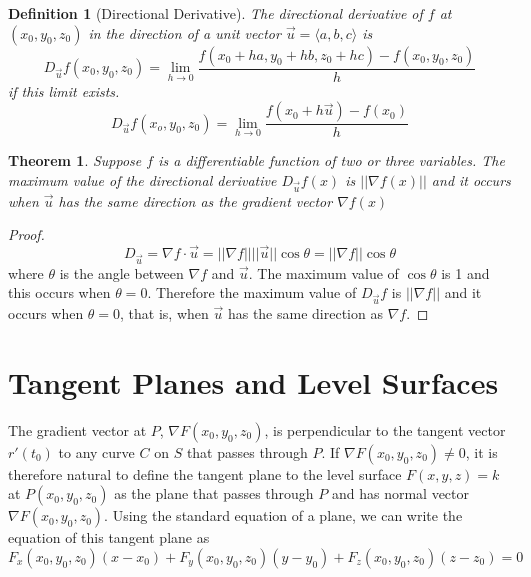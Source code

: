 \documentclass[10pt]{report}
\newtheorem{thm2}{Theorem}[section]
\newtheorem{def2}{Definition}[section]
\newcommand{\grad}{\nabla}
\begin{document}
\begin{def2}[Directional Derivative]
The directional derivative of $f$ at $(x_0, y_0, z_0)$ in the direction of a unit vector $\vec{u} = \langle a,b,c\rangle$ is
$$D_{\vec{u}} f(x_0, y_0,z_0) = \lim_{h\to 0}\frac{f(x_0 + ha, y_0+hb, z_0 +hc) - f(x_0,y_0,z_0)}{h}$$
if this limit exists.
$$D_{\vec{u}}f(x_o,y_0,z_0)=\lim_{h\to 0}\frac{f(x_0+h\vec{u})-f(x_0)}{h}$$
\end{def2}
\begin{thm2}
Suppose $f$ is a differentiable function of two or three variables. The maximum value of the directional derivative $D_{\vec{u}}f(x)$ is $||\grad f(x)||$ and it occurs when $\vec{u}$ has the same direction as the gradient vector $\grad f(x)$
\end{thm2}
\begin{proof}
$$D_{\vec{u}}=\grad f\cdot \vec{u}=||\grad f||||\vec{u}||\cos \theta = ||\grad f|| \cos \theta$$
where $\theta$ is the angle between $\grad f$ and $\vec{u}$. The maximum value of $\cos \theta$ is 1 and this occurs when $\theta = 0$. Therefore the maximum value of $D_{\vec{u}}f$ is $||\grad f||$ and it occurs when $\theta = 0$, that is, when $\vec{u}$ has the same direction as $\grad f$.
\end{proof}
\section{Tangent Planes and Level Surfaces}
The gradient vector at $P$, $\grad F(x_0,y_0,z_0)$, is perpendicular to the tangent vector $r'(t_0)$ to any curve $C$ on $S$ that passes through $P$. If $\grad F(x_0,y_0,z_0)\neq 0$, it is therefore natural to define the tangent plane to the level surface $F(x,y,z)=k$ at $P(x_0,y_0,z_0)$ as the plane that passes through $P$ and has normal vector $\grad F(x_0,y_0,z_0)$. Using the standard equation of a plane, we can write the equation of this tangent plane as
$$F_x(x_0,y_0,z_0)(x-x_0)+F_y(x_0,y_0,z_0)(y-y_0)+F_z(x_0,y_0,z_0)(z-z_0) = 0$$
\end{document}
